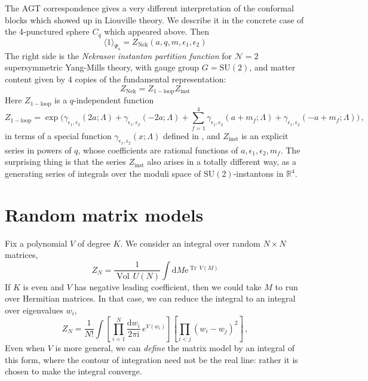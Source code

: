 \documentclass[12pt,letterpaper,reqno]{amsart}
\numberwithin{equation}{section}
\newcommand{\cN}{\ensuremath{\mathcal N}}
\newcommand{\bbR}{\ensuremath{\mathbb R}}
\newcommand{\I}{{\mathrm i}}
\newcommand{\e}{{\mathrm e}}
\newcommand{\de}{\mathrm{d}}
\newcommand{\inst}{\mathrm{inst}}
\newcommand{\Nek}{\mathrm{Nek}}
\newcommand{\oneloop}{\mathrm{1-loop}}
\newcommand{\SU}{\mathrm{SU}}
\newcommand{\IP}[1]{\langle#1\rangle}
\newcommand{\eps}{\epsilon}
\newcommand{\ti}[1]{\textit{#1}}
\DeclareMathOperator{\Tr}{Tr}
\DeclareMathOperator{\Vol}{Vol}
\DeclareRobustCommand{\fixme}[1]{\leavevmode{\color{orange}[#1]}}
\begin{document}
The AGT correspondence gives a very different interpretation of
the conformal blocks which showed up in Liouville theory.
We describe it in the concrete case of the 4-punctured
sphere $C_q$ which appeared above. Then
\begin{equation}
  \IP{1}_{\Psi_a} = Z_\Nek(a,q,m,\eps_1,\eps_2)
\end{equation}
The right side is the \ti{Nekrasov instanton partition function}
for $\cN=2$ supersymmetric Yang-Mills theory, with
gauge group $G = \SU(2)$, and matter content given by
$4$ copies of the fundamental representation:
\begin{equation}
  Z_\Nek = Z_{\oneloop} Z_\inst
\end{equation}
Here $Z_{\oneloop}$ is a $q$-independent function
\begin{equation}
Z_{\oneloop}
= \exp \Big(
\gamma_{{\eps_1},{\eps_2}}(2a;\Lambda)+\gamma_{{\eps_1},{\eps_2}}(-2a;\Lambda)
+\sum_{f=1}^4 \gamma_{{\eps_1},{\eps_2}}(a+m_f;\Lambda)+\gamma_{{\eps_1},{\eps_2}}(-a+m_f;\Lambda) \Big) \, ,
\end{equation}
in terms of a special function $\gamma_{\eps_1,\eps_2}(x;\Lambda)$
defined in \fixme{...},
and $Z_{\inst}$ is an explicit series in powers of $q$,
whose coefficients are rational functions of 
$a, \eps_1, \eps_2, m_f$. The surprising thing is that the
series $Z_{\inst}$ also arises in a totally different way,
as a generating series of integrals over the moduli space of
$\SU(2)$-instantons in $\bbR^4$.


\fixme{give explicit formula}



\section{Random matrix models}

Fix a polynomial $V$ of degree $K$.
We consider an integral over random $N \times N$ matrices,
\begin{equation}
  Z_N = \frac{1}{\Vol\,U(N)} \int \de M \e^{\Tr\, V(M)}
\end{equation}
If $K$ is even and $V$ has negative leading coefficient, 
then we could take $M$ to run over Hermitian matrices.
In that case, we can reduce the integral to an integral over eigenvalues $w_i$,
\begin{equation}
  Z_N = \frac{1}{N!} \int\left[\prod_{i=1}^N \frac{\de w_i}{2 \pi \I} \,e^{V(w_i)} \right] \left[\prod_{i<j}(w_i-w_j)^2\right] \, ,  
\end{equation}
Even when $V$ is more general, we can \ti{define} the matrix model by an integral of this form,
where the contour of integration need not be the real line: rather it is chosen to make the integral converge.
\end{document}
